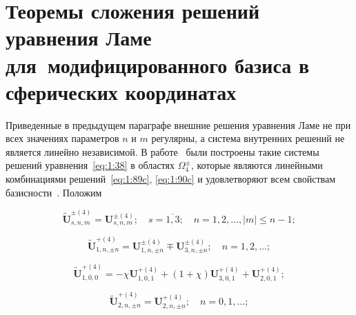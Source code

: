 %
%

\section{Теоремы сложения решений уравнения Ламе для~модифицированного базиса в сферических координатах}

Приведенные в предыдущем параграфе внешние решения уравнения Ламе не при всех значениях параметров $n$ и $m$ регулярны, а система внутренних решений не является линейно независимой. В работе~\cite{Nikolaev1993} были построены такие системы решений уравнения~\eqref{eq:1:38} в областях $\Omega_4^{\pm}$, которые являются линейными комбинациями решений~\eqref{eq:1:89c}, \eqref{eq:1:90c} и удовлетворяют всем свойствам базисности~\cite{Nikolaev1998}. Положим

\begin{equation}\label{eq:1:89b}
\mathbf{\tilde U}_{s,n,m}^{\pm(4)}=\mathbf{U}_{s,n,m}^{\pm(4)};\quad s=\overline{1,3};\quad n=1,2,\dots, |m|\le n-1;
\end{equation}

\begin{equation}\label{eq:1:90b}
\mathbf{\tilde U}_{1,n,\pm n}^{+(4)}=\mathbf{U}_{1,n,\pm n}^{\pm(4)}\mp\mathbf{U}_{3,n,\pm n}^{\pm(4)};\quad n=1,2,\dots;
\end{equation}

\begin{equation}\label{eq:1:91b}
\mathbf{\tilde U}_{1,0,0}^{+(4)}=-\chi\mathbf{U}_{1,0,1}^{+(4)}+(1+\chi)\mathbf{U}_{3,0,1}^{+(4)}+\mathbf{U}_{2,0,1}^{+(4)};
\end{equation}

\begin{equation}\label{eq:1:92b}
\mathbf{\tilde U}_{2,n,\pm n}^{+(4)}=\mathbf{U}_{2,n,\pm n}^{+(4)};\quad n=0,1,\dots;
\end{equation}

